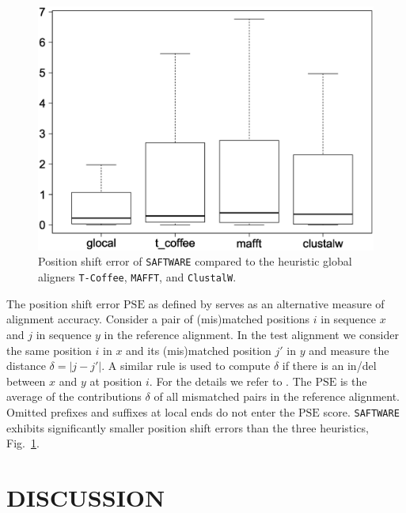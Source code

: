 \documentclass[a4paper,10pt]{article}
\let\cite\citep
\newcommand{\TODO}[1]{\begingroup\color{red}#1\endgroup}
\newcommand{\SAFTWARE}{\TODO{\texttt{SAFTWARE}}}
\begin{document}
\begin{figure}
  \begin{center}
    \includegraphics[width=1\columnwidth]{pse_compued_correctly.eps}
  \end{center}
  \caption{Position shift error of \SAFTWARE{} compared to the heuristic
    global aligners \texttt{T-Coffee}, \texttt{MAFFT}, and
    \texttt{ClustalW}.}
  \label{fig:pse}
\end{figure}

The position shift error $\mbox{PSE}$ as defined by \citet{oxbench} serves
as an alternative measure of alignment accuracy. Consider a pair of
(mis)matched positions $i$ in sequence $x$ and $j$ in sequence $y$ in the
reference alignment. In the test alignment we consider the same position
$i$ in $x$ and its (mis)matched position $j'$ in $y$ and measure the
distance $\delta=|j-j'|$. A similar rule is used to compute $\delta$ if
there is an in/del between $x$ and $y$ at position $i$. For the details we
refer to \cite{oxbench}. The $\mbox{PSE}$ is the average of the
contributions $\delta$ of all mismatched pairs in the reference alignment.
Omitted prefixes and suffixes at local ends do not enter the $\mbox{PSE}$
score. \SAFTWARE{} exhibits significantly smaller position shift errors
than the three heuristics, Fig.~\ref{fig:pse}.

\section{\uppercase{Discussion}}
\end{document}
